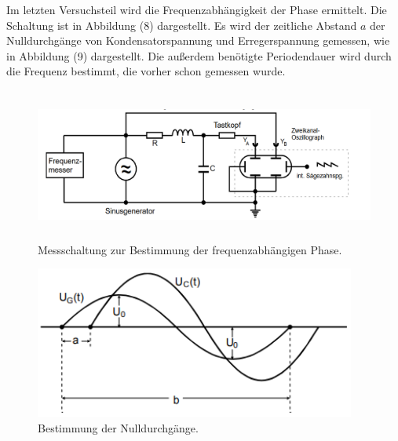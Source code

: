 \noindent Im letzten Versuchsteil wird die Frequenzabhängigkeit der Phase ermittelt. Die Schaltung ist in Abbildung (8) dargestellt.
Es wird der zeitliche Abstand $a$ der Nulldurchgänge von Kondensatorspannung und Erregerspannung gemessen, wie in Abbildung (9) dargestellt.
Die außerdem benötigte Periodendauer wird durch die Frequenz bestimmt, die vorher schon gemessen wurde.
\begin{figure}[H]
  \centering
  \includegraphics[height=5cm]{Schaltung4.png}
  \caption{Messschaltung zur Bestimmung der frequenzabhängigen Phase. \cite[S. 13]{kent}}
\end{figure}
\begin{figure}[H]
  \centering
  \includegraphics[height=5cm]{phi.png}
  \caption{Bestimmung der Nulldurchgänge. \cite[S. 7]{l}}
\end{figure}

